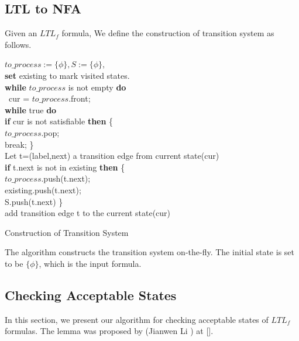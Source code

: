 \subsection{LTL to NFA}
Given an  $ LTL_f$ formula, We define the construction of transition system as follows. \\
  \begin{algorithm}[H]
    \SetAlgoNoLine
    \BlankLine
 $to\_process:=\{\phi\}, S:=\{\phi\}$, \\
\textbf{set} existing to mark visited states.\\
\textbf{while} $to\_process$ is not empty \textbf{do} \\
\ cur =  $to\_process$.front;  \\
\quad  \textbf{while} true \textbf{do} \\
\qquad   \textbf{if} cur is not satisfiable  \textbf{then} \{ \\
\qquad \quad $to\_process$.pop; \\
\qquad \quad break;     \}\\
 \qquad  Let t=(label,next) a transition edge from current state(cur) \\
\qquad\textbf{if} t.next is not in existing \textbf{then} \{ \\
\qquad \quad $to\_process$.push(t.next); \\
\qquad \quad existing.push(t.next); \\
\qquad  \quad S.push(t.next)  \}\\
\qquad  add transition edge t to the current state(cur)
 \caption{Construction of Transition System}
\end{algorithm}

The algorithm constructs the transition system on-the-fly. The initial state is set to be $\{\phi\}$, which is the input formula. 
\subsection{Checking Acceptable States}
In this section, we present our algorithm for checking acceptable states of $LTL_f$ formulas. The lemma  was proposed by (Jianwen Li ) at [].  \\

